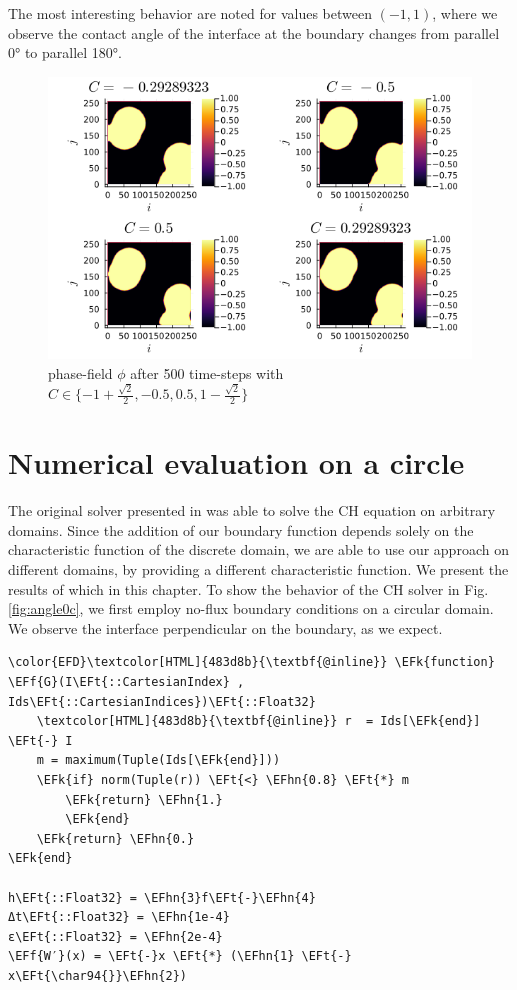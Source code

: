 \documentclass{mimosis}
\newcommand{\EFk}[1]{\textcolor{EFk}{#1}} %
\newcommand{\EFf}[1]{\textcolor{EFf}{#1}} %
\newcommand{\EFt}[1]{\textcolor{EFt}{#1}} %
\newcommand{\EFhn}[1]{\textcolor{EFhn}{#1}} %
\begin{document}
The most interesting behavior are noted for values between \((-1,1)\), where we observe the contact angle of the interface at the boundary changes from parallel 0° to parallel 180°.
\begin{figure}[htbp]
\centering
\includegraphics[width=.9\linewidth]{images/angle-sqrt(2).png}
\caption{\label{fig:angle-multiple}phase-field \(\phi\) after 500 time-steps with \(C \in \{-1 + \frac{\sqrt{2}}{2} , -0.5 , 0.5 , 1 - \frac{\sqrt{2}}{2} \}\)}
\end{figure}
\chapter{Numerical evaluation on a circle}
\label{sec:org7ce30bd}
The original solver presented in \autocite{SHIN20117441} was able to solve the CH equation on arbitrary domains. Since the addition of our boundary function depends solely on the characteristic function of the discrete domain, we are able to use our approach on different domains, by providing a different characteristic function. We present the results of which in this chapter.
To show the behavior of the CH solver in Fig. \ref{fig:angle0c}, we first employ no-flux boundary conditions on a circular domain. We observe the interface perpendicular on the boundary, as we expect.

\begin{Code}
\begin{Verbatim}
\color{EFD}\textcolor[HTML]{483d8b}{\textbf{@inline}} \EFk{function} \EFf{G}(I\EFt{::CartesianIndex} , Ids\EFt{::CartesianIndices})\EFt{::Float32}
    \textcolor[HTML]{483d8b}{\textbf{@inline}} r  = Ids[\EFk{end}] \EFt{-} I
    m = maximum(Tuple(Ids[\EFk{end}]))
    \EFk{if} norm(Tuple(r)) \EFt{<} \EFhn{0.8} \EFt{*} m
        \EFk{return} \EFhn{1.}
        \EFk{end}
    \EFk{return} \EFhn{0.}
\EFk{end}

h\EFt{::Float32} = \EFhn{3}f\EFt{-}\EFhn{4}
Δt\EFt{::Float32} = \EFhn{1e-4}
ε\EFt{::Float32} = \EFhn{2e-4}
\EFf{W′}(x) = \EFt{-}x \EFt{*} (\EFhn{1} \EFt{-} x\EFt{\char94{}}\EFhn{2})
\end{Verbatim}
\end{Code}
\end{document}
